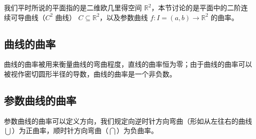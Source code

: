 
\begin{issues}
\issueDraft
\end{issues}


我们平时所说的平面指的是二维欧几里得空间 $\mathbb{R}^2$，本节讨论的是平面中的二阶连续可导曲线（$C^2$ 曲线） $C \subseteq \mathbb{R}^2$，以及参数曲线 $f: I = (a, b) \to \mathbb{R}^2$ 的曲率。

\subsection{曲线的曲率}

曲线的曲率被用来衡量曲线的弯曲程度，直线的曲率恒为零；由于曲线的曲率可以被视作密切圆形半径的导数，曲线的曲率是一个非负数。

\subsection{参数曲线的曲率}

参数曲线的曲率可以定义方向，我们规定向逆时针方向弯曲（形如从左往右的曲线$\bigcup$）为正曲率，顺时针方向弯曲（$\bigcap$）为负曲率。